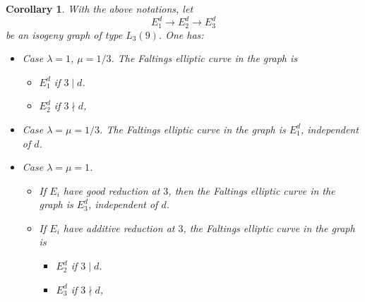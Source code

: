\documentclass[
  journal=small,
  manuscript=article-type,  %
  year=2020,
  volume=37,
]{cup-journal}
\newtheorem{cor}{Corollary}
\begin{document}
{\color{red}
\begin{cor}
With the above notations, let
$$
E_1^d \longrightarrow E_2^d \longrightarrow E_3^d
$$
be an isogeny graph of type $L_3(9)$. One has:

\begin{itemize}
     \item[(i)] Case $\lambda=1$, $\mu=1/3$. The Faltings elliptic curve in the graph is 
     \begin{itemize}
         \item[$\bullet$] $E_1^d$ if $3\mid d$.
         \item[$\bullet$] $E_2^d$ if $3\nmid d$, 
     \end{itemize}
 \item[(ii)] Case $\lambda=\mu=1/3$.     The Faltings elliptic curve in the graph is $E_1^d$, independent of $d$.
 \item[(i)] Case $\lambda=\mu=1$.
    \begin{itemize}
    \item[$\bullet$] If $E_i$ have good reduction at $3$, then the Faltings elliptic curve in the graph is $E_3^d$, independent of $d$.
    \item[$\bullet$] If $E_i$ have additive reduction at $3$, the Faltings elliptic curve in the graph is
     \begin{itemize}
         \item[$\bullet$] $E_2^d$ if $3\mid d$.
         \item[$\bullet$] $E_3^d$ if $3\nmid d$, 
     \end{itemize}
     \end{itemize}
\end{itemize}
\end{cor}
}
\end{document}
